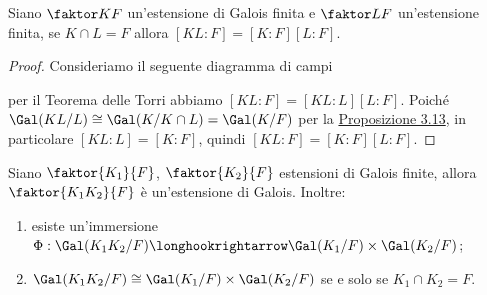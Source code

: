 \documentclass[11pt]{scrartcl}
\begin{document}
	\begin{corollary}
		Siano $\faktor K F$ un'estensione di Galois finita e $\faktor L F$ un'estensione finita, se $K\cap L = F$ allora $[KL:F] = [K:F][L:F]$.
	\end{corollary}
	
	\begin{proof}
		Consideriamo il seguente diagramma di campi
		\begin{center}
		\end{center}
		per il Teorema delle Torri abbiamo $[KL:F] = [KL:L][L:F]$. Poiché 
		$\Gal(KL/L) \cong \Gal(K/K\cap L) = \Gal(K/F)$ per la 
		\hyperref[prop3.13]{Proposizione 3.13}, in particolare $[KL:L] = [K:F]$,
		quindi $[KL:F] = [K:F][L:F]$.
	\end{proof}
	
	\begin{proposition}
		\label{prop3.15}
		Siano $\faktor{K_1}{F}$, $\faktor{K_2}{F}$ estensioni di Galois finite, 
		allora $\faktor{K_1K_2}{F}$ è un'estensione di Galois. Inoltre:
		\begin{enumerate}[(1)]
			\item esiste un'immersione $\Phi: \Gal(K_1K_2/F) \longhookrightarrow 
			\Gal(K_1/F)\times\Gal(K_2/F)$;
			\item $\Gal(K_1K_2/F)\cong \Gal(K_1/F)\times\Gal(K_2/F)$ se e solo 
			se $K_1\cap K_2 = F$. 
		\end{enumerate}
	\end{proposition}
	
\end{document}
